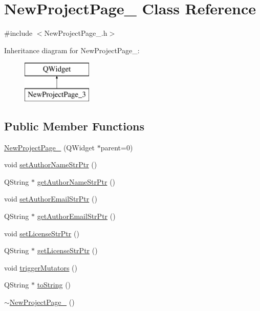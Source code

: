 \hypertarget{class_new_project_page__3}{\section{New\-Project\-Page\-\_ Class Reference}
\label{class_new_project_page__3}
}


{\ttfamily \#include $<$New\-Project\-Page\-\_.\-h$>$}

Inheritance diagram for New\-Project\-Page\-\_\-:\begin{figure}[H]
\begin{center}
\leavevmode
\includegraphics[height=2.000000cm]{class_new_project_page__3}
\end{center}
\end{figure}
\subsection*{Public Member Functions}
\begin{DoxyCompactItemize}
\item 
\hyperlink{class_new_project_page__3_a0da0f6c6970df16449698d300a485897}{New\-Project\-Page\-\_} (Q\-Widget $\ast$parent=0)
\item 
void \hyperlink{class_new_project_page__3_a3f8f5a89ed4cc2f92de221de8d73d680}{set\-Author\-Name\-Str\-Ptr} ()
\item 
Q\-String $\ast$ \hyperlink{class_new_project_page__3_af7f2bc3bd9fba4428e1353ee9ea0e482}{get\-Author\-Name\-Str\-Ptr} ()
\item 
void \hyperlink{class_new_project_page__3_a1241063e919bd850d6c605dc57cd2e88}{set\-Author\-Email\-Str\-Ptr} ()
\item 
Q\-String $\ast$ \hyperlink{class_new_project_page__3_a48085a3d584c78e95f9259a8f0861981}{get\-Author\-Email\-Str\-Ptr} ()
\item 
void \hyperlink{class_new_project_page__3_a8b23adfed5683dd547bcdb0b21eaf56b}{set\-License\-Str\-Ptr} ()
\item 
Q\-String $\ast$ \hyperlink{class_new_project_page__3_a80b1c3388841590a7b8e9201623fe573}{get\-License\-Str\-Ptr} ()
\item 
void \hyperlink{class_new_project_page__3_a0895bbb7ddabccb9866e903c99a6607c}{trigger\-Mutators} ()
\item 
Q\-String $\ast$ \hyperlink{class_new_project_page__3_a3c01978e394cd6b858b3d4637ad73c16}{to\-String} ()
\item 
\hyperlink{class_new_project_page__3_ae7fe32d76cbda4acb2831c94089ea2bf}{$\sim$\-New\-Project\-Page\-\_} ()
\end{DoxyCompactItemize}
